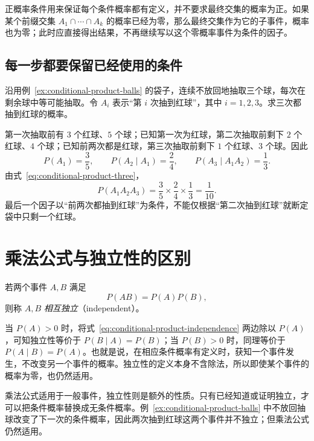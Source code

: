 \documentclass[UTF8,12pt,a4paper,fontset=fandol]{ctexart}
\begin{document}
正概率条件用来保证每个条件概率都有定义，并不要求最终交集的概率为正。如果某个前缀交集 $A_1\cap\cdots\cap A_k$ 的概率已经为零，那么最终交集作为它的子事件，概率也为零；此时应直接得出结果，不再继续写以这个零概率事件为条件的因子。

\subsection{每一步都要保留已经使用的条件}

\begin{example}[连续三次抽到红球]
沿用例~\ref{ex:conditional-product-balls} 的袋子，连续不放回地抽取三个球，每次在剩余球中等可能抽取。令 $A_i$ 表示“第 $i$ 次抽到红球”，其中 $i=1,2,3$。求三次都抽到红球的概率。
\end{example}
\begin{solve}
第一次抽取前有 $3$ 个红球、$5$ 个球；已知第一次为红球，第二次抽取前剩下 $2$ 个红球、$4$ 个球；已知前两次都是红球，第三次抽取前剩下 $1$ 个红球、$3$ 个球。因此
\[
  P(A_1)=\frac35,\qquad
  P(A_2\mid A_1)=\frac24,\qquad
  P(A_3\mid A_1A_2)=\frac13.
\]
由式~\eqref{eq:conditional-product-three}，
\[
  P(A_1A_2A_3)=\frac35\times\frac24\times\frac13=\frac1{10}.
\]
最后一个因子以“前两次都抽到红球”为条件，不能仅根据“第二次抽到红球”就断定袋中只剩一个红球。
\end{solve}

\section{乘法公式与独立性的区别}
\label{sec:conditional-product-independence}

\begin{definition}[两个事件的独立性]
\label{def:conditional-product-independence}
若两个事件 $A,B$ 满足
\begin{equation}
  P(AB)=P(A)P(B),
  \label{eq:conditional-product-independence}
\end{equation}
则称 $A,B$ \emph{相互独立}（independent）。
\end{definition}

当 $P(A)>0$ 时，将式~\eqref{eq:conditional-product-independence} 两边除以 $P(A)$，可知独立性等价于 $P(B\mid A)=P(B)$；当 $P(B)>0$ 时，同理等价于 $P(A\mid B)=P(A)$。也就是说，在相应条件概率有定义时，获知一个事件发生，不改变另一个事件的概率。独立性的定义本身不含除法，所以即使某个事件的概率为零，也仍然适用。

乘法公式适用于一般事件，独立性则是额外的性质。只有已经知道或证明独立，才可以把条件概率替换成无条件概率。例~\ref{ex:conditional-product-balls} 中不放回抽球改变了下一次的条件概率，因此两次抽到红球这两个事件并不独立；但乘法公式仍然适用。
\end{document}
